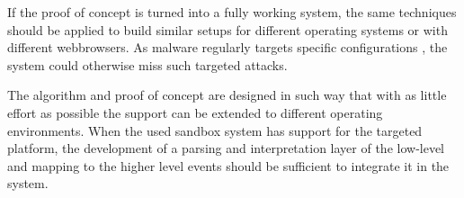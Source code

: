 If the proof of concept is turned into a fully working system, the same techniques should be applied to build similar setups for different operating systems or with different webbrowsers. As malware regularly targets specific configurations , the system could otherwise miss such targeted attacks.

The algorithm and proof of concept are designed in such way that with as little effort as possible the support can be extended to different operating environments. When the used sandbox system has support for the targeted platform, the development of a parsing and interpretation layer of the low-level and mapping to the higher level events should be sufficient to integrate it in the system.

